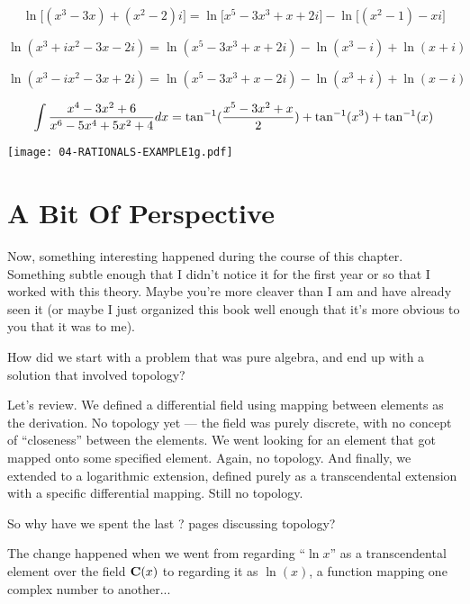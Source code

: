 
$$\ln\Big[(x^3-3x)+(x^2-2)i\Big] = \ln\Big[x^5-3x^3+x+2i\Big] - \ln\Big[(x^2-1)-xi\Big]$$

$$\ln(x^3+ix^2-3x-2i) = \ln(x^5-3x^3+x+2i) - \ln(x^3-i) + \ln(x+i)$$

$$\ln(x^3-ix^2-3x+2i) = \ln(x^5-3x^3+x-2i) - \ln(x^3+i) + \ln(x-i)$$


$$\int {{x^4-3x^2+6}\over{x^6-5x^4+5x^2+4}} dx =
\tan^{-1}({{x^5-3x^2+x}\over2}) + \tan^{-1}(x^3) + \tan^{-1}(x)$$

\begin{center}
\texttt{[image: 04-RATIONALS-EXAMPLE1g.pdf]}
\end{center}

\vfill\eject


\section{A Bit Of Perspective}

Now, something interesting happened during the course of this chapter.
Something subtle enough that I didn't notice it for the first year or
so that I worked with this theory.  Maybe you're more cleaver than I
am and have already seen it (or maybe I just organized this book well
enough that it's more obvious to you that it was to me).

How did we start with a problem that was pure algebra, and end up with
a solution that involved topology?

Let's review.  We defined a differential field using mapping between
elements as the derivation.  No topology yet --- the field was purely
discrete, with no concept of ``closeness'' between the elements.  We
went looking for an element that got mapped onto some specified
element.  Again, no topology.  And finally, we extended to a
logarithmic extension, defined purely as a transcendental extension
with a specific differential mapping.  Still no topology.

So why have we spent the last ? pages discussing topology?

The change happened when we went from regarding ``$\ln x$'' as a
transcendental element over the field ${\bf C}(x)$ to regarding it as
$\ln(x)$, a function mapping one complex number to another...


